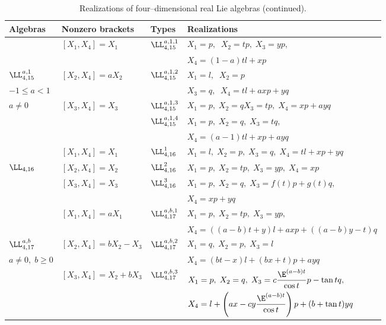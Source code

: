 \begin{table}
\label{t8}
\caption{Realizations of four--dimensional real Lie algebras (continued).}
\begin{center}
\begin{tabular}{|l|l|l|l|}
\hline
Algebras & Nonzero brackets & Types & Realizations\\
\hline
& $[X_1,X_4]=X_1$& $\LL_{4,15}^{a,1,1}$ & $X_1=p,\;\;X_2=tp,\;X_3=yp,$\\
& & &                              $  X_4=(1-a)tl+xp$\\
\cline{3-4}
$\LL_{4,15}^{a,1}$ & $[X_2,X_4]=aX_2$ & $\LL_{4,15}^{a,1,2}$ &
$X_1=l,\;\;X_2=p$\\
$-1\le a <1$ &   &   & $X_3=q,\;\;X_4=tl+axp+yq$\\
 \cline{3-4}
$a\ne 0$ & $[X_3,X_4]=X_3$ & $\LL_{4,15}^{a,1,3}$ & $X_1=p,\;X_2=q
                                 X_3=tp,\;X_4=xp+ayq$\\
 \cline{3-4}
  &   & $\LL_{4,15}^{a,1,4}$ & $X_1=p,\;X_2=q,\;X_3=tq,$\\
& &  & $X_4=(a-1)tl+xp+ayq$\\
\hline
& $[X_1,X_4]=X_1$ & $\LL_{4,16}^1$ & $ X_1=l,\;X_2=p,\;X_3=q,\; 
                                         X_4=tl+xp+yq$\\
\cline{3-4}
$\LL_{4,16}$ & $[X_2,X_4]=X_2$ & $\LL_{4,16}^2$ & $X_1=p,\;X_2=tp,\;X_3=yp,\;
                                                   X_4=xp$\\
\cline{3-4}
 & $[X_3,X_4]=X_3$ & $\LL_{4,16}^3$ & $X_1=p,\;X_2=q,\;X_3=f(t)p+g(t)q,$\\ 
 & & &                                     $X_4=xp+yq$\\
\hline
 & $[X_1,X_4]=aX_1$& $\LL_{4,17}^{a,b,1}$ & $X_1=p,\;X_2=tp,\;X_3=yp,$\\
 &    &    & $X_4=((a-b)t+y)l+axp+((a-b)y-t)q$\\
 \cline{3-4}
$\LL_{4,17}^{a,b}$& $[X_2,X_4]=bX_2-X_3$ & $\LL_{4,17}^{a,b,2}$ &
$X_1=q,\;X_2=p,\;X_3=l$\\
$a\ne 0,\;b\ge 0$ &     &   & $X_4=(bt-x)l+(bx+t)p+ayq$\\
\cline{3-4}
 &$[X_3,X_4]=X_2+bX_3$ & $\LL_{4,17}^{a,b,3}$ & $X_1=p,\;X_2=q,\;
 X_3=c\displaystyle{\frac{\E^{(a-b)t}}{\cos t}}p-\tan t q,$\\
  &    &    & $X_4=l+\left (ax-cy\displaystyle{\frac{\E^{(a-b)t}}{\cos t}}
  \right )p + (b+\tan t)y q $\\
\hline
\end{tabular}
\end{center}
\end{table}

%
 

